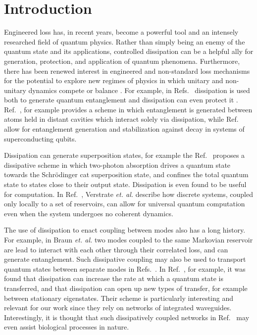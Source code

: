 \section{Introduction}

Engineered loss has, in recent years, become a powerful tool and an intensely researched field of quantum physics. Rather than simply being an enemy of the quantum state and its applications, controlled dissipation can be a helpful ally for generation, protection, and application of quantum phenomena. Furthermore, there has been renewed interest in engineered and non-standard loss mechanisms for the potential to explore new regimes of physics in which unitary and non-unitary dynamics compete or balance \cite{Ozawa2018a, Lieu2018}. For example, in Refs.~\cite{Wolinsky1988, Braun2002, Clark2003, Roghani2018} dissipation is used both to generate quantum entanglement and dissipation can even protect it \cite{Zanardi1997}. Ref.~\cite{Clark2003}, for example provides a scheme in which entanglement is generated between atoms held in distant cavities which interact solely via dissipation, while Ref.~\cite{Kimchi-Schwartz2016} allow for entanglement generation and stabilization against decay in systems of superconducting qubits. %

Dissipation can generate superposition states, for example the Ref.~\cite{Leghtas2015} proposes a dissipative scheme in which two-photon absorption drives a quantum state towards the Schr{\"o}dinger cat superposition state, and confines the total quantum state to states close to their output state. Dissipation is even found to be useful for computation. In Ref.~\cite{Verstraete2009}, Verstrate \emph{et. al.} describe how discrete systems, coupled only locally to a set of reservoirs, can allow for universal quantum computation even when the system undergoes no coherent dynamics.


The use of dissipation to enact coupling between modes also has a long history. For example, in Braun \emph{et. al.} \cite{Braun2002} two modes coupled to the same Markovian reservoir are lead to interact with each other through their correlated loss, and can generate entanglement. Such dissipative coupling may also be used to transport quantum states between separate modes in Refs.~\cite{Metelmann2015, Porras2019, Biggerstaff2016, Mogilevtsev2015, Xuereb2018}. In Ref.~\cite{Biggerstaff2016}, for example, it was found that dissipation can increase the rate at which a quantum state is transferred, and that dissipation can open up new types of transfer, for example between stationary eigenstates. Their scheme is particularly interesting and relevant for our work since they rely on networks of integrated waveguides. Interestingly, it is thought that such dissipatively coupled networks in Ref.~\cite{Biggerstaff2016} may even assist biological processes in nature.


